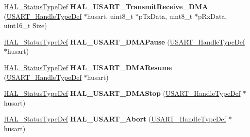 \begin{DoxyCompactItemize}
\item 
\mbox{\label{group___u_s_a_r_t___exported___functions___group2_ga8ad37a3c54b720f1f0a2a32dafcac6df}} 
\hyperlink{stm32f0xx__hal__def_8h_a63c0679d1cb8b8c684fbb0632743478f}{H\+A\+L\+\_\+\+Status\+Type\+Def} {\bfseries H\+A\+L\+\_\+\+U\+S\+A\+R\+T\+\_\+\+Transmit\+Receive\+\_\+\+D\+MA} (\hyperlink{struct_u_s_a_r_t___handle_type_def}{U\+S\+A\+R\+T\+\_\+\+Handle\+Type\+Def} $\ast$husart, uint8\+\_\+t $\ast$p\+Tx\+Data, uint8\+\_\+t $\ast$p\+Rx\+Data, uint16\+\_\+t Size)
\item 
\mbox{\label{group___u_s_a_r_t___exported___functions___group2_gab6d960d952daee0b6aa82fbf0a4b61b0}} 
\hyperlink{stm32f0xx__hal__def_8h_a63c0679d1cb8b8c684fbb0632743478f}{H\+A\+L\+\_\+\+Status\+Type\+Def} {\bfseries H\+A\+L\+\_\+\+U\+S\+A\+R\+T\+\_\+\+D\+M\+A\+Pause} (\hyperlink{struct_u_s_a_r_t___handle_type_def}{U\+S\+A\+R\+T\+\_\+\+Handle\+Type\+Def} $\ast$husart)
\item 
\mbox{\label{group___u_s_a_r_t___exported___functions___group2_ga20e7a0e7864825eb18c9ee57a4e63fb7}} 
\hyperlink{stm32f0xx__hal__def_8h_a63c0679d1cb8b8c684fbb0632743478f}{H\+A\+L\+\_\+\+Status\+Type\+Def} {\bfseries H\+A\+L\+\_\+\+U\+S\+A\+R\+T\+\_\+\+D\+M\+A\+Resume} (\hyperlink{struct_u_s_a_r_t___handle_type_def}{U\+S\+A\+R\+T\+\_\+\+Handle\+Type\+Def} $\ast$husart)
\item 
\mbox{\label{group___u_s_a_r_t___exported___functions___group2_gabeaf40f697cb852cb54a3ad81df4375e}} 
\hyperlink{stm32f0xx__hal__def_8h_a63c0679d1cb8b8c684fbb0632743478f}{H\+A\+L\+\_\+\+Status\+Type\+Def} {\bfseries H\+A\+L\+\_\+\+U\+S\+A\+R\+T\+\_\+\+D\+M\+A\+Stop} (\hyperlink{struct_u_s_a_r_t___handle_type_def}{U\+S\+A\+R\+T\+\_\+\+Handle\+Type\+Def} $\ast$husart)
\item 
\mbox{\label{group___u_s_a_r_t___exported___functions___group2_gaaa1acf7fb356bce3e06b2df77b317c9d}} 
\hyperlink{stm32f0xx__hal__def_8h_a63c0679d1cb8b8c684fbb0632743478f}{H\+A\+L\+\_\+\+Status\+Type\+Def} {\bfseries H\+A\+L\+\_\+\+U\+S\+A\+R\+T\+\_\+\+Abort} (\hyperlink{struct_u_s_a_r_t___handle_type_def}{U\+S\+A\+R\+T\+\_\+\+Handle\+Type\+Def} $\ast$husart)

\end{DoxyCompactItemize}
